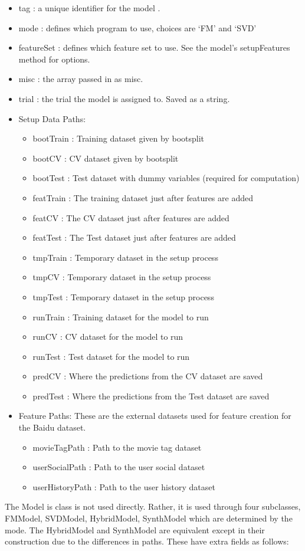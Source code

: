 \documentclass{article}
\begin{document}
\begin{itemize}
\item tag : a unique identifier for the model .
\item mode : defines which program to use, choices are `FM' and `SVD' \item featureSet : defines which feature set to use. See the model's setupFeatures method for options.
\item misc : the array passed in as misc. 
\item trial : the trial the model is assigned to. Saved as a string.
\item Setup Data Paths: 
	\begin{itemize}
	\item bootTrain : Training dataset given by bootsplit
	\item bootCV : CV dataset given by bootsplit 
	\item bootTest : Test dataset with dummy variables (required for computation) 
	\item featTrain : The training dataset just after features are added 
	\item featCV : The CV dataset just after features are added
	\item featTest : The Test dataset just after features are added \item tmpTrain : Temporary dataset in the setup process
	\item tmpCV : Temporary dataset in the setup process 
	\item tmpTest : Temporary dataset in the setup process 
	\item runTrain : Training dataset for the model to run 
	\item runCV : CV dataset for the model to run 
	\item runTest : Test dataset for the model to run 
	\item predCV : Where the predictions from the CV dataset are saved 
	\item predTest : Where the predictions from the Test dataset are saved
	\end{itemize}
\item Feature Paths: These are the external datasets used for feature creation for the Baidu dataset.
	\begin{itemize}
	\item movieTagPath : Path to the movie tag dataset 
	\item userSocialPath : Path to the user social dataset 
	\item userHistoryPath : Path to the user history dataset
	\end{itemize}
\end{itemize}
The Model is class is not used directly. Rather, it is used through four subclasses, FMModel, SVDModel, HybridModel, SynthModel which are determined by the mode. The HybridModel and SynthModel are equivalent  except in their construction due to the differences in paths. These have extra fields as follows:
\end{document}
